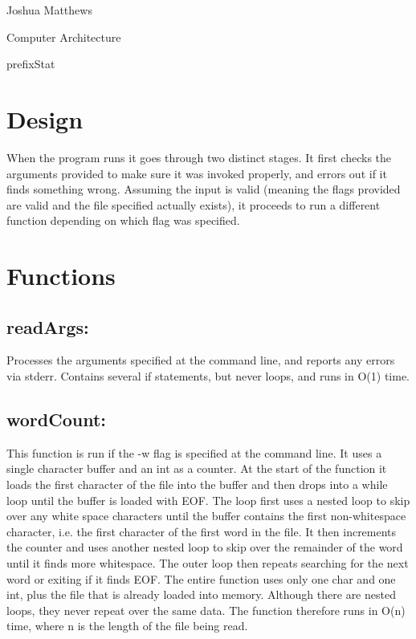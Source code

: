 \documentclass[letterpaper,12pt]{article}
\begin{document}
\noindent Joshua Matthews

\noindent Computer Architecture

\noindent prefixStat

\section{Design}
When the program runs it goes through two distinct stages. It first checks the arguments provided to make sure it was invoked properly, and errors out if it finds something wrong. Assuming the input is valid (meaning the flags provided are valid and the file specified actually exists), it proceeds to run a different function depending on which flag was specified.

\section{Functions}
\subsection{readArgs:}
Processes the arguments specified at the command line, and reports any errors via stderr. Contains several if statements, but never loops, and runs in O(1) time.

\subsection{wordCount:}
This function is run if the -w flag is specified at the command line. It uses a single character buffer and an int as a counter. At the start of the function it loads the first character of the file into the buffer and then drops into a while loop until the buffer is loaded with EOF. The loop first uses a nested loop to skip over any white space characters until the buffer contains the first non-whitespace character, i.e. the first character of the first word in the file. It then increments the counter and uses another nested loop to skip over the remainder of the word until it finds more whitespace. The outer loop then repeats searching for the next word or exiting if it finds EOF. The entire function uses only one char and one int, plus the file that is already loaded into memory. Although there are nested loops, they never repeat over the same data. The function therefore runs in O(n) time, where n is the length of the file being read.
\end{document}
